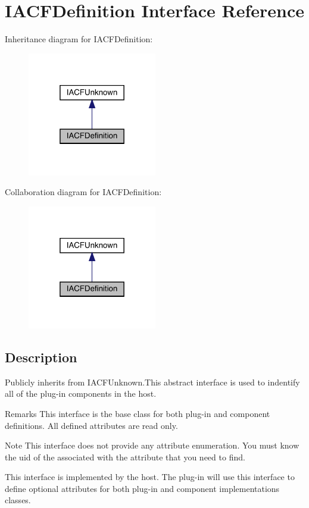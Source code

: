 \hypertarget{a01413}{}\section{I\+A\+C\+F\+Definition Interface Reference}
\label{a01413}


Inheritance diagram for I\+A\+C\+F\+Definition\+:
\nopagebreak
\begin{figure}[H]
\begin{center}
\leavevmode
\includegraphics[width=160pt]{a01412}
\end{center}
\end{figure}


Collaboration diagram for I\+A\+C\+F\+Definition\+:
\nopagebreak
\begin{figure}[H]
\begin{center}
\leavevmode
\includegraphics[width=160pt]{a01411}
\end{center}
\end{figure}


\subsection{Description}
Publicly inherits from I\+A\+C\+F\+Unknown.\+This abstract interface is used to indentify all of the plug-\/in components in the host. 

\begin{DoxyRemark}{Remarks}
This interface is the base class for both plug-\/in and component definitions. All defined attributes are read only.
\end{DoxyRemark}
\begin{DoxyNote}{Note}
This interface does not provide any attribute enumeration. You must know the uid of the associated with the attribute that you need to find. 

This interface is implemented by the host. The plug-\/in will use this interface to define optional attributes for both plug-\/in and component implementations classes. 
\end{DoxyNote}
